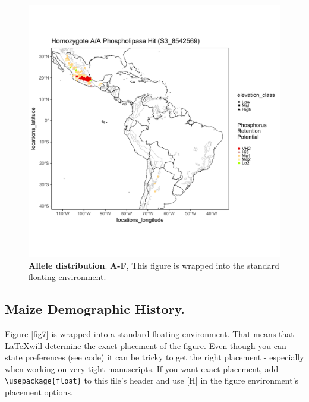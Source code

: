 \documentclass[10pt,letterpaper]{article}
\begin{document}
\begin{figure}[ht] %

\includegraphics[width=\textwidth]{fig6.pdf}

\caption{\color{Gray} \textbf{Allele distribution}. \textbf{A-F}, This figure is wrapped into the standard floating environment.}

\label{fig6} %

\end{figure}


\subsection*{Maize Demographic History.}
Figure \ref{fig7} is wrapped into a standard floating environment. That means that \LaTeX will determine the exact placement of the figure. Even though you can state preferences (see code) it can be tricky to get the right placement - especially when working on very tight manuscripts. If you want exact placement, add \verb!\usepackage{float}! to this file's header and use [H] in the figure environment's placement options.
\end{document}
